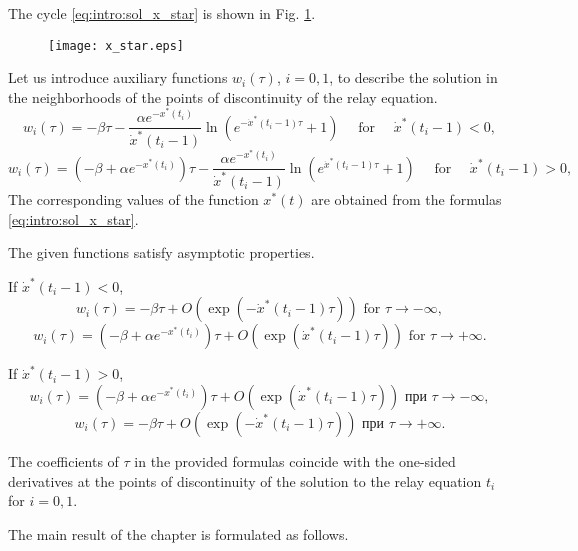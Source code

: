 The cycle \eqref{eq:intro:sol_x_star} is shown in Fig. \ref{fig:intro:x_star:ch1}.

\begin{figure}
	\centering
	\texttt{[image: x\_star.eps]}
	\label{fig:intro:x_star:ch1}
\end{figure}

Let us introduce auxiliary functions $w_i(\tau)$, $i = 0, 1$, to describe the solution in the neighborhoods of the points of discontinuity of the relay equation.
\[
w_i(\tau) = -\beta \tau - \dfrac{\alpha e^{-x^*(t_i)}}{\dot{x}^*(t_i - 1)} \ln\left(e^{-\dot{x}^*(t_i - 1)\tau} + 1\right) \quad \text{ for } \quad \dot{x}^*(t_i - 1) < 0,
\]
\[
w_i(\tau) = (-\beta + \alpha e^{-x^*(t_i)})\tau - \dfrac{\alpha e^{-x^*(t_i)}}{\dot{x}^*(t_i - 1)} \ln\left(e^{\dot{x}^*(t_i - 1)\tau} + 1\right) \quad \text{ for } \quad \dot{x}^*(t_i - 1) > 0,
\]
The corresponding values of the function $x^*(t)$ are obtained from the formulas \eqref{eq:intro:sol_x_star}.

The given functions satisfy asymptotic properties.

If $\dot{x}^*(t_i - 1) < 0$,
\begin{equation*}
	w_i(\tau) = -\beta \tau + O(\exp(-\dot{x}^*(t_i - 1) \tau)) \text{ for } \tau \to -\infty,
\end{equation*}
\begin{equation*}
	w_i(\tau) = (-\beta + \alpha e^{-x^*(t_i)})\tau + O(\exp(\dot{x}^*(t_i - 1) \tau)) \text{ for } \tau \to +\infty.
\end{equation*}

If $\dot{x}^*(t_i - 1) > 0$,
\begin{equation*}
	w_i(\tau) = (-\beta + \alpha e^{-x^*(t_i)})\tau + O(\exp(\dot{x}^*(t_i - 1) \tau)) \text{ при } \tau \to -\infty,
\end{equation*}
\begin{equation*}
	w_i(\tau) = -\beta \tau + O(\exp(-\dot{x}^*(t_i - 1) \tau)) \text{ при } \tau \to +\infty.
\end{equation*}

The coefficients of $\tau$ in the provided formulas coincide with the one-sided derivatives at the points of discontinuity of the solution to the relay equation $t_i$ for $i = 0, 1$.

The main result of the chapter is formulated as follows.

